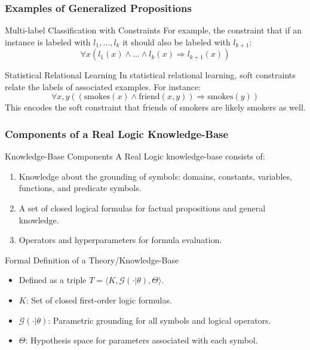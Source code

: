 \documentclass{beamer}
\newcommand{\G}{\mathcal{G}}
\begin{document}
\begin{frame}
\frametitle{Examples of Generalized Propositions}
\begin{block}{Multi-label Classification with Constraints}
For example, the constraint that if an instance is labeled with
$l_1,...,l_k$ it should also be labeled with $l_{k+1}$:
\[ \forall x (l_1(x) \land \ldots \land l_k(x) \Rightarrow l_{k+1}(x)) \]
\end{block}

\begin{block}{Statistical Relational Learning}
In statistical relational learning, soft constraints relate the labels
of associated examples. For instance:
\[ \forall x,y ((\text{smokes}(x) \land \text{friend}(x, y))
  \Rightarrow \text{smokes}(y)) \]
This encodes the soft constraint that friends of smokers are likely
smokers as well.
\end{block}
\end{frame}

\begin{frame}
\frametitle{Components of a Real Logic Knowledge-Base}
\begin{block}{Knowledge-Base Components}
A Real Logic knowledge-base consists of:
\begin{enumerate}
    \item Knowledge about the grounding of symbols: domains, constants, variables, functions, and predicate symbols.
    \item A set of closed logical formulas for factual propositions and general knowledge.
    \item Operators and hyperparameters for formula evaluation.
\end{enumerate}
\end{block}

\begin{block}{Formal Definition of a Theory/Knowledge-Base}
\begin{itemize}
    \item Defined as a triple \( T = \langle K, \G(\cdot | \theta), \Theta \rangle \).
    \item \( K \): Set of closed first-order logic formulas.
    \item \( \G(\cdot | \theta) \): Parametric grounding for all symbols and logical operators.
    \item \( \Theta \): Hypothesis space for parameters associated with each symbol.
\end{itemize}
\end{block}
\end{frame}
\end{document}
